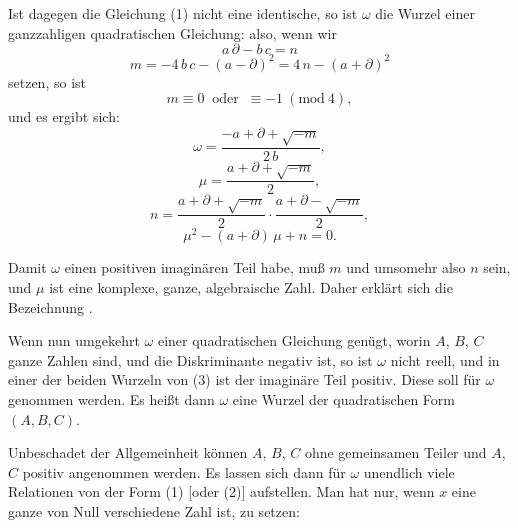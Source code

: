 Ist dagegen die Gleichung (1) nicht eine identische, so ist $\omega$
die Wurzel einer ganzzahligen quadratischen Gleichung:
also, wenn wir
\[
a\,\partial - b\,c = n
\]
\[
m = -4\,b\,c - (a-\partial)^2 = 4\,n - (a+\partial)^2
\]
setzen, so ist
\[
m \equiv 0 \ \text{ oder } \ \equiv -1 \ (\mathrm{mod}\ 4),
\]
und es ergibt sich:
\[
\omega = \frac{-a+\partial+\sqrt{-m}}{2\,b},
\]
\[
\mu = \frac{a+\partial+\sqrt{-m}}{2},
\]
\[
n = \frac{a+\partial+\sqrt{-m}}{2}\cdot\frac{a+\partial-\sqrt{-m}}{2}, %
\]
\[
\mu^2 - (a+\partial)\,\mu + n = 0.
\]

Damit $\omega$ einen positiven imaginären Teil habe, muß $m$ und
umsomehr also $n$  sein, und $\mu$ ist eine komplexe, ganze,
algebraische Zahl. Daher erklärt sich die Bezeichnung .

Wenn nun umgekehrt $\omega$ einer quadratischen Gleichung
genügt, worin $A$, $B$, $C$ ganze Zahlen sind, und die Diskriminante
negativ ist, so ist $\omega$ nicht reell, und in einer der beiden Wurzeln
von (3) ist der imaginäre Teil positiv. Diese soll für $\omega$ genommen
werden. Es heißt dann $\omega$ eine Wurzel der quadratischen Form
$(A, B, C)$.

Unbeschadet der Allgemeinheit können $A$, $B$, $C$ ohne gemeinsamen
Teiler und $A$, $C$ positiv angenommen werden. Es lassen sich dann für
$\omega$ unendlich viele Relationen von der Form (1) [oder (2)]
aufstellen. Man hat nur, wenn $x$ eine ganze von Null verschiedene Zahl
ist, zu setzen:
